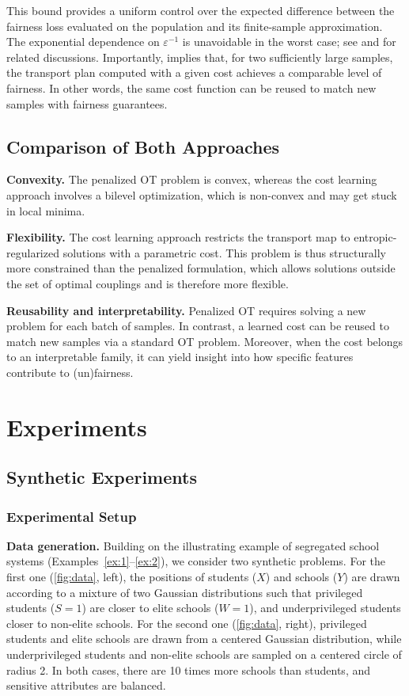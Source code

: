 \documentclass{article}
\theoremstyle{definition}
\begin{document}
This bound provides a uniform control over the expected difference between the fairness loss evaluated on the population and its finite-sample approximation.
The exponential dependence on $\varepsilon^{-1}$ is unavoidable in the worst case; see \citet{rigollet2022sample} and \citet{altschuler2022asymptotics} for related discussions.
Importantly,  implies that, for two sufficiently large samples, the transport plan computed with a given cost achieves a comparable level of fairness. In other words, the same cost function can be reused to match new samples with fairness guarantees.
\subsection{Comparison of Both Approaches}
\label{sec:comparison}
\textbf{Convexity.} The penalized OT problem is convex, whereas the cost learning approach involves a bilevel optimization, which is non-convex and may get stuck in local minima.

\textbf{Flexibility.} The cost learning approach restricts the transport map to entropic-regularized solutions with a parametric cost. This problem is thus structurally more constrained than the penalized formulation, which allows solutions outside the set of optimal couplings and is therefore more flexible.

\textbf{Reusability and interpretability.} Penalized OT requires solving a new problem for each batch of samples. In contrast, a learned cost can be reused to match new samples via a standard OT problem. Moreover, when the cost belongs to an interpretable family, it can yield insight into how specific features contribute to (un)fairness.
\section{Experiments}
\subsection{Synthetic Experiments}
\subsubsection{Experimental Setup}\label{ssec:approaches}
\textbf{Data generation.} Building on the illustrating example of segregated school systems (Examples~\ref{ex:1}--\ref{ex:2}), we consider two synthetic problems. For the first one (\cref{fig:data}, left), the positions of students ($X$) and schools ($Y$) are drawn according to a mixture of two Gaussian distributions such that privileged students ($S=1$) are closer to elite schools ($W=1$), and underprivileged students closer to non-elite schools. For the second one (\cref{fig:data}, right), privileged students and elite schools are drawn from a centered Gaussian distribution, while underprivileged students and non-elite schools are sampled on a centered circle of radius 2. In both cases, there are 10 times more schools than students, and sensitive attributes are balanced.
\end{document}
